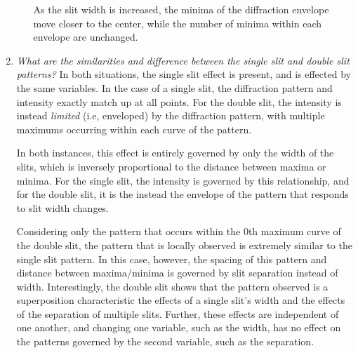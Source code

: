 \documentclass[twocolumn,english]{IEEEtran}
\theoremstyle{plain}
\theoremstyle{plain}
\begin{document}
\begin{enumerate}
\begin{enumerate}
		As the slit width is increased, the minima of the diffraction envelope move closer to the center, while the number of minima within each envelope are unchanged.
	\end{enumerate}

	\item \textit{What are the similarities and difference between the single slit and double slit patterns?}
	In both situations, the single slit effect is present, and is effected by the same variables. In the case of a single slit, the diffraction pattern and intensity exactly match up at all points. For the double slit, the intensity is instead \textit{limited} (i.e, enveloped) by the diffraction pattern, with multiple maximums occurring within each curve of the pattern.

	In both instances, this effect is entirely governed by only the width of the slits, which is inversely proportional to the distance between maxima or minima. For the single slit, the intensity is governed by this relationship, and for the double slit, it is the instead the envelope of the pattern that responds to slit width changes.

	Considering only the pattern that occurs within the $0$th maximum curve of the double slit, the pattern that is locally observed is extremely similar to the single slit pattern. In this case, however, the spacing of this pattern and distance between maxima/minima is governed by slit separation instead of width. Interestingly, the double slit shows that the pattern observed is a superposition characteristic the effects of a single slit's width and the effects of the separation of multiple slits. Further, these effects are independent of one another, and changing one variable, such as the width, has no effect on the patterns governed by the second variable, such as the separation.
\end{enumerate}

%
%
\end{document}
